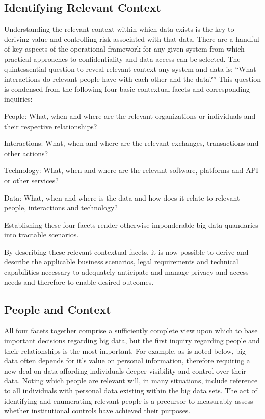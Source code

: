 \subsection{Identifying Relevant Context}

Understanding the relevant context within which data exists is the key to deriving value and controlling risk associated with that data. There are a handful of key aspects of the operational framework for any given system from which practical approaches to confidentiality and data access can be selected. 
The quintessential question to reveal relevant context any system and data is: “What interactions do relevant people have with each other and the data?” This question is condensed from the following four basic contextual facets and corresponding inquiries:

People: What, when and where are the relevant organizations or individuals and their respective relationships?

Interactions: What, when and where are the relevant exchanges, transactions and other actions?

Technology: What, when and where are the relevant software, platforms and API or other services?

Data: What, when and where is the data and how does it relate to relevant people, interactions and technology?

Establishing these four facets render otherwise imponderable big data quandaries into tractable scenarios.

By describing these relevant contextual facets, it is now possible to derive and describe the applicable business scenarios, legal requirements and technical capabilities necessary to adequately anticipate and manage privacy and access needs and therefore to enable desired outcomes.

\subsection{People and Context}

All four facets together comprise a sufficiently complete view upon which to base important decisions regarding big data, but the first inquiry regarding people and their relationships is the most important.
For example, as is noted below, big data often depends for it’s value on personal information, therefore requiring a new deal on data affording individuals deeper visibility and control over their data.
Noting which people are relevant will, in many situations, include reference to all individuals with personal data existing within the big data sets.
The act of identifying and enumerating relevant people is a precursor to measurably assess whether institutional controls have achieved their purposes.

